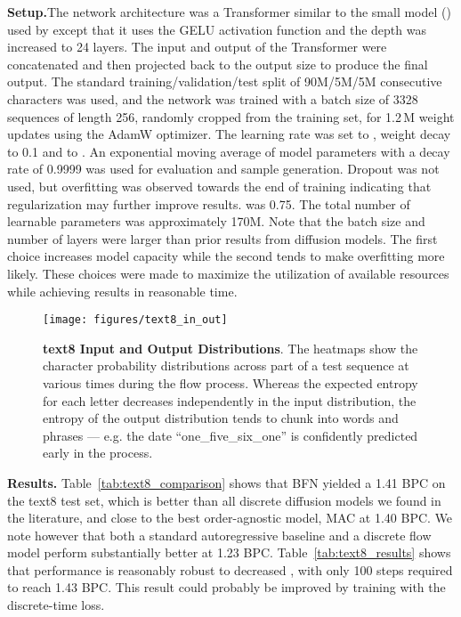 \documentclass[11pt,table]{article}
\newcommand{\0}[1]{\constvec{0}{#1}}
\newcommand{\1}[1]{\constvec{1}{#1}}
\begin{document}
\noindent\textbf{Setup.}\quad The network architecture was a Transformer similar to the small model () used by \citet{radford2019language} except that it uses the GELU activation function \citep{hendrycks2016gaussian} and the depth was increased to 24 layers.
The input and output of the Transformer were concatenated and then projected back to the output size to produce the final output.
The standard training/validation/test split of 90M/5M/5M consecutive characters was used, and
the network was trained with a batch size of 3328 sequences of length 256, randomly cropped from the training set, for 1.2\,M weight updates using the AdamW optimizer\citep{loshchilov2017decoupled}. 
The learning rate was set to , weight decay to 0.1 and  to .
An exponential moving average of model parameters with a decay rate of 0.9999 was used for evaluation and sample generation.
Dropout was not used, but overfitting was observed towards the end of training indicating that regularization may further improve results.
 was 0.75.
The total number of learnable parameters was approximately 170M.
Note that the  batch size and number of layers were larger than prior results from diffusion models. 
The first choice increases model capacity while the second tends to make overfitting more likely.
These choices were made to maximize the utilization of available resources while achieving results in reasonable time.
\\

\begin{figure}[t!]
\centering
\texttt{[image: figures/text8\_in\_out]}
\caption{\textbf{text8 Input and Output Distributions}. The heatmaps show the character probability distributions across part of a test sequence at various times during the flow process. Whereas the expected entropy for each letter decreases independently in the input distribution, the entropy of the output distribution tends to chunk into words and phrases --- e.g. the date ``one\_five\_six\_one'' is confidently predicted early in the process.}
\end{figure}

\noindent\textbf{Results.}\quad
Table~\ref{tab:text8_comparison} shows that BFN yielded a  1.41 BPC on the text8 test set, which is better than all discrete diffusion models we found in the literature, and close to the best order-agnostic model, MAC at 1.40 BPC.
We note however that both a standard autoregressive baseline and a discrete flow model perform substantially better at 1.23 BPC.
Table~\ref{tab:text8_results} shows that performance is reasonably robust to decreased , with only 100 steps required to reach 1.43 BPC.
This result could probably be improved by training with the discrete-time loss.
\end{document}
